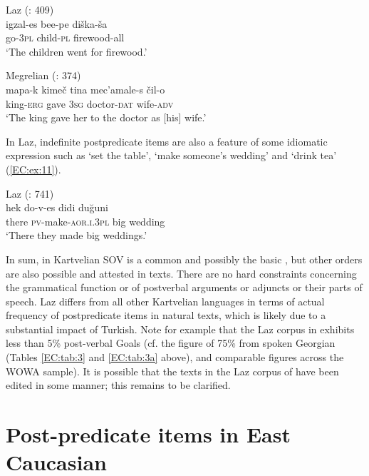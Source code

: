 \documentclass[output=paper,colorlinks,citecolor=brown,draftmode]{langscibook}
\begin{document}
\ea\label{EC:ex:9}
Laz (\citealt{holisky_laz_1991}: 409) \\
\gll igzal-es bee-pe diška-ša \\
go\textsc{-3pl} child\textsc{-pl} firewood-all \\
\glt `The children went for firewood.' 
\z

\ea\label{EC:ex:10}
Megrelian (\citealt{harris_mingrelian_1991}: 374) \\
\gll mapa-k kimeč tina mec'amale-s čil-o \\
king\textsc{-erg} gave \textsc{3sg} doctor\textsc{-dat} wife\textsc{-adv} \\
\glt `The king gave her to the doctor as [his] wife.'
\z

In Laz, indefinite postpredicate items are also a feature of some idiomatic expression such as `set the table', `make someone's wedding' and `drink tea' (\ref{EC:ex:11}).

\ea\label{EC:ex:11}
Laz (\citealt{lacroix_description_2009}: 741) \\
\gll hek do-v-es didi duğuni \\
there \textsc{pv-}make\textsc{-aor.i.3pl} big wedding \\
\glt `There they made big weddings.'
\z

In sum, in Kartvelian SOV is a common and possibly the basic , but other orders are also possible and attested in texts. There are no hard constraints concerning the grammatical function or  of postverbal arguments or adjuncts or their parts of speech. Laz differs from all other Kartvelian languages in terms of actual frequency of postpredicate items in natural texts, which is likely due to a substantial impact of Turkish. Note for example that the Laz corpus in \citet{stilo_laz_2021} exhibits less than 5\% post-verbal Goals (cf. the figure of 75\% from spoken Georgian (Tables \ref{EC:tab:3} and \ref{EC:tab:3a} above), and comparable figures across the WOWA sample). It is possible that the texts in the Laz corpus of \citet{stilo_laz_2021} have been edited in some manner; this remains to be clarified.


\section{Post-predicate items in East Caucasian}\label{EC:ss:3}
\end{document}
